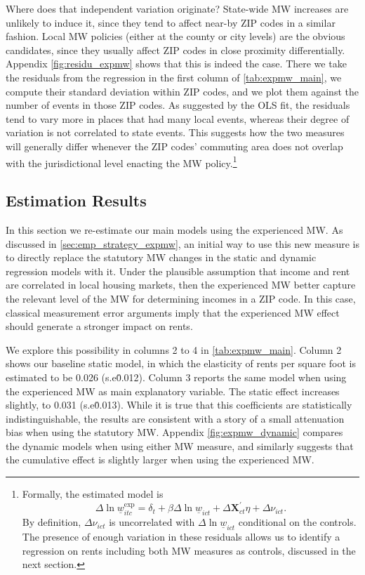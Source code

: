 Where does that independent variation originate? State-wide MW increases are unlikely to 
induce it, since they tend to affect near-by ZIP codes in a similar fashion. Local MW policies 
(either at the county or city levels) are the obvious candidates, since they usually affect 
ZIP codes in close proximity differentially. Appendix \autoref{fig:residu_expmw} shows that 
this is indeed the case. There we take the residuals from the regression in the first column 
of \autoref{tab:expmw_main}, we compute their standard deviation within ZIP codes, and we plot 
them against the number of events in those ZIP codes. As suggested by the OLS fit, the residuals
tend to vary more in places that had many local events, whereas their degree of variation is not 
correlated to state events. This suggests how the two measures will generally differ whenever the 
ZIP codes' commuting area does not overlap with the jurisdictional level enacting the MW 
policy.\footnote{Formally, the estimated model is 
	$$ \Delta \ln \underline{w}_{itc}^{\text{exp}} = \delta_t 
				+ \beta \Delta \ln \underline{w}_{ict} + \Delta \mathbf{X}^{'}_{ct} \eta 
				+ \Delta \nu_{ict} . $$
	By definition, $\Delta \nu_{ict}$ is uncorrelated with $\Delta \ln \underline{w}_{ict}$ 
	conditional on the controls. The presence of enough variation in these residuals allows us
	to identify a regression on rents including both MW measures as controls, discussed in the
	next section.}


\subsection{Estimation Results}

In this section we re-estimate our main models using the experienced MW. As discussed in 
\autoref{sec:emp_strategy_expmw}, an initial way to use this new measure is to directly
replace the statutory MW changes in the static and dynamic regression models with it. 
Under the plausible assumption that income and rent are correlated in local housing 
markets, then the experienced MW better capture the relevant level of the MW for 
determining incomes in a ZIP code. In this case, classical measurement error arguments 
imply that the experienced MW effect should generate a stronger impact on rents. 

We explore this possibility in columns 2 to 4 in \autoref{tab:expmw_main}. Column 2 
shows our baseline static model, in which the elasticity of rents per square foot is 
estimated to be 0.026 (s.e\. 0.012). Column 3 reports the same model when using the 
experienced MW as main explanatory variable. The static effect increases slightly, to 
0.031 (s.e\. 0.013). While it is true that this coefficients are statistically 
indistinguishable, the results are consistent with a story of a small attenuation bias 
when using the statutory MW. Appendix \autoref{fig:expmw_dynamic} compares the dynamic 
models when using either MW measure, and similarly suggests that the cumulative effect 
is slightly larger when using the experienced MW.

